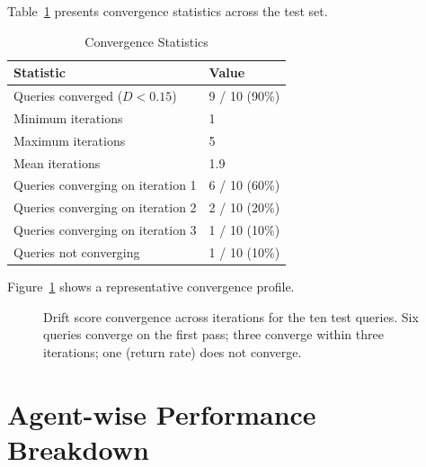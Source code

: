 \documentclass[12pt,a4paper]{report}
\begin{document}
Table~\ref{tab:convergence-stats} presents convergence statistics across the test set.

\begin{table}[H]
  \centering
  \caption{Convergence Statistics}
  \label{tab:convergence-stats}
  \renewcommand{\arraystretch}{1.2}
  \begin{tabularx}{\textwidth}{@{}lX@{}}
    \toprule
    \textbf{Statistic} & \textbf{Value} \\
    \midrule
    Queries converged ($D < 0.15$)   & 9 / 10 (90\%) \\
    Minimum iterations               & 1 \\
    Maximum iterations               & 5 \\
    Mean iterations                  & 1.9 \\
    Queries converging on iteration 1 & 6 / 10 (60\%) \\
    Queries converging on iteration 2 & 2 / 10 (20\%) \\
    Queries converging on iteration 3 & 1 / 10 (10\%) \\
    Queries not converging            & 1 / 10 (10\%) \\
    \bottomrule
  \end{tabularx}
\end{table}

Figure~\ref{fig:convergence} shows a representative convergence profile.

\begin{figure}[H]
  \centering
  \caption{Drift score convergence across iterations for the ten test queries. Six queries converge on the first pass; three converge within three iterations; one (return rate) does not converge.}
  \label{fig:convergence}
\end{figure}

\section{Agent-wise Performance Breakdown}
\label{sec:agent-performance}
\end{document}
